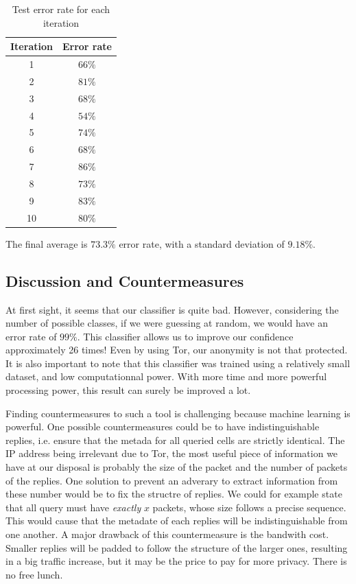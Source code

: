 \documentclass[10pt,conference,compsocconf]{IEEEtran}
\begin{document}
\begin{table}
    \centering
    \begin{tabular}{|c|c|}
        \hline
        Iteration & Error rate      \\
        \hline
        1      & $66\%$  \\
        \hline
        2      & $81\%$  \\
        \hline
        3      & $68\%$  \\
        \hline
        4      & $54\%$  \\
        \hline 
        5      & $74\%$  \\
        \hline
        6      & $68\%$  \\
        \hline 
        7      & $86\%$  \\
        \hline
        8      & $73\%$  \\
        \hline 
        9      & $83\%$  \\
        \hline
        10      & $80\%$  \\
        \hline      
    \end{tabular}
    \caption{Test error rate for each iteration}
    \label{test_error}
\end{table}

The final average is $73.3\%$ error rate, with a standard deviation of $9.18\%$.

\subsection{Discussion and Countermeasures}
At first sight, it seems that our classifier is quite bad. However, considering the number of possible classes, if we were guessing at random, we would have an error rate of $99\%$. This classifier allows us to improve our confidence approximately 26 times! Even by using Tor, our anonymity is not that protected. It is also important to note that this classifier was trained using a relatively small dataset, and low computationnal power. With more time and more powerful processing power, this result can surely be improved a lot.

Finding countermeasures to such a tool is challenging because machine learning is powerful. One possible countermeasures could be to have indistinguishable replies, i.e. ensure that the metada for all queried cells are strictly identical. The IP address being irrelevant due to Tor, the most useful piece of information we have at our disposal is probably the size of the packet and the number of packets of the replies. One solution to prevent an adverary to extract information from these number would be to fix the structre of replies. We could for example state that all query must have \textit{exactly} $x$ packets, whose size follows a precise sequence. This would cause that the metadate of each replies will be indistinguishable from one another. A major drawback of this countermeasure is the bandwith cost. Smaller replies will be padded to follow the structure of the larger ones, resulting in a big traffic increase, but it may be the price to pay for more privacy. There is no free lunch.
\end{document}

